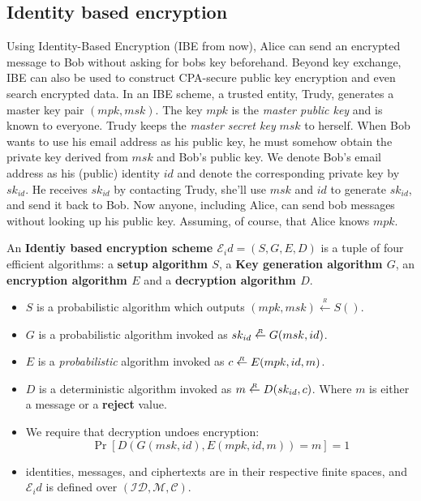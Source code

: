 \subsection{Identity based encryption}
Using Identity-Based Encryption (IBE from now), Alice can send an encrypted message to Bob
without asking for bobs key beforehand. Beyond key exchange, IBE can also 
be used to construct CPA-secure public key encryption and even search encrypted data.
In an IBE scheme, a trusted entity, Trudy, generates a master key pair $(mpk, msk)$.
The key $mpk$ is the \emph{master public key} and is known to everyone. Trudy keeps the \emph{master 
secret key} $msk$ to herself. When Bob wants to use his email address as his public key, he must
somehow obtain the private key derived from $msk$ and Bob's public key.
We denote Bob's email address as his (public) identity $id$ and denote the corresponding private key 
by $sk_{id}$. He receives $sk_{id}$ by contacting Trudy, she'll use $msk$ and $id$ to generate $sk_{id}$,
and send it back to Bob.
Now anyone, including Alice, can send bob messages without looking up his public key. 
Assuming, of course, that Alice knows $mpk$.

\begin{definition}
  An \textbf{Identiy based encryption scheme $ \mathcal{E}_id =(S,G,E,D)$}
  is a tuple of four efficient algorithms: a \textbf{setup algorithm $S$}, a 
  \textbf{Key generation algorithm $G$}, an \textbf{encryption algorithm $E$}
  and a \textbf{decryption algorithm $D$}.

  \begin{itemize}
    \item $S$ is a probabilistic algorithm which outputs $(mpk, msk) \overset{_R}{\leftarrow} S()$.
    \item $G$ is a probabilistic algorithm invoked as $sk_{id} \overset{_R}{\leftarrow} G(msk, id)$.
    \item $E$ is a \emph{probabilistic} algorithm invoked as $c \overset{_R}{\leftarrow} E(mpk, id, m)$.
    \item $D$ is a deterministic algorithm invoked as $m\overset{_R}{\leftarrow} D(sk_{id},c)$. Where $m$ is
      either a message or a \textbf{reject} value.
    \item We require that decryption undoes encryption: 
    $$ \Pr[D(G(msk,id), E(mpk,id,m))=m]=1$$
    \item identities, messages, and ciphertexts are in their respective finite spaces,
    and $\mathcal{E}_id$ is defined over $(\mathcal{ID},\mathcal{M},\mathcal{C})$.
  \end{itemize}
\end{definition}

